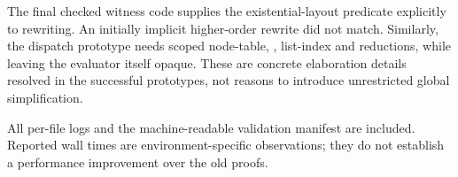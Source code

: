 The final checked witness code supplies the existential-layout predicate
explicitly to rewriting. An initially implicit higher-order rewrite did
not match. Similarly, the dispatch prototype needs scoped node-table,
, list-index and  reductions, while
leaving the evaluator itself opaque. These are concrete elaboration
details resolved in the successful prototypes, not reasons to introduce
unrestricted global simplification.

All per-file logs and the machine-readable validation manifest are included.
Reported wall times are environment-specific observations; they do not
establish a performance improvement over the old proofs.
